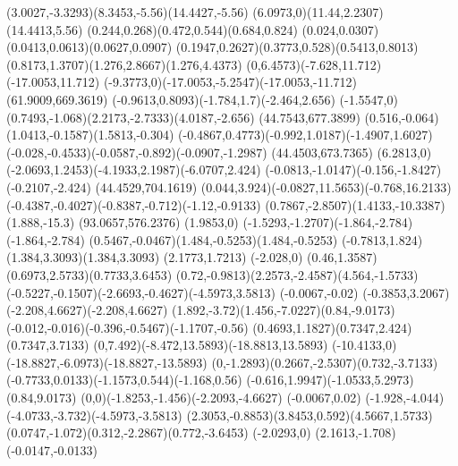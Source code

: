 {    \rcurveto(3.0027,-3.3293)(8.3453,-5.56)(14.4427,-5.56)
    \rcurveto(6.0973,0)(11.44,2.2307)(14.4413,5.56)
    \rcurveto(0.244,0.268)(0.472,0.544)(0.684,0.824)
    \rcurveto(0.024,0.0307)(0.0413,0.0613)(0.0627,0.0907)
    \rcurveto(0.1947,0.2627)(0.3773,0.528)(0.5413,0.8013)
    \rcurveto(0.8173,1.3707)(1.276,2.8667)(1.276,4.4373)
    \rcurveto(0,6.4573)(-7.628,11.712)(-17.0053,11.712)
    \rcurveto(-9.3773,0)(-17.0053,-5.2547)(-17.0053,-11.712)
    \moveto(61.9009,669.3619)
    \rcurveto(-0.9613,0.8093)(-1.784,1.7)(-2.464,2.656)
    \rlineto(-1.5547,0)
    \rcurveto(0.7493,-1.068)(2.2173,-2.7333)(4.0187,-2.656)
    \moveto(44.7543,677.3899)
    \rcurveto(0.516,-0.064)(1.0413,-0.1587)(1.5813,-0.304)
    \rcurveto(-0.4867,0.4773)(-0.992,1.0187)(-1.4907,1.6027)
    \rcurveto(-0.028,-0.4533)(-0.0587,-0.892)(-0.0907,-1.2987)
    \moveto(44.4503,673.7365)
    \rlineto(6.2813,0)
    \rcurveto(-2.0693,1.2453)(-4.1933,2.1987)(-6.0707,2.424)
    \rcurveto(-0.0813,-1.0147)(-0.156,-1.8427)(-0.2107,-2.424)
    \moveto(44.4529,704.1619)
    \rcurveto(0.044,3.924)(-0.0827,11.5653)(-0.768,16.2133)
    \rcurveto(-0.4387,-0.4027)(-0.8387,-0.712)(-1.12,-0.9133)
    \rcurveto(0.7867,-2.8507)(1.4133,-10.3387)(1.888,-15.3)
    \closepath
    \moveto(93.0657,576.2376)
    \rlineto(1.9853,0)
    \rcurveto(-1.5293,-1.2707)(-1.864,-2.784)(-1.864,-2.784)
    \rcurveto(0.5467,-0.0467)(1.484,-0.5253)(1.484,-0.5253)
    \rcurveto(-0.7813,1.824)(1.384,3.3093)(1.384,3.3093)
    \rlineto(2.1773,1.7213)
    \rlineto(-2.028,0)
    \rcurveto(0.46,1.3587)(0.6973,2.5733)(0.7733,3.6453)
    \rcurveto(0.72,-0.9813)(2.2573,-2.4587)(4.564,-1.5733)
    \rcurveto(-0.5227,-0.1507)(-2.6693,-0.4627)(-4.5973,3.5813)
    \rlineto(-0.0067,-0.02)
    \rcurveto(-0.3853,3.2067)(-2.208,4.6627)(-2.208,4.6627)
    \rcurveto(1.892,-3.72)(1.456,-7.0227)(0.84,-9.0173)
    \rcurveto(-0.012,-0.016)(-0.396,-0.5467)(-1.1707,-0.56)
    \rcurveto(0.4693,1.1827)(0.7347,2.424)(0.7347,3.7133)
    \rcurveto(0,7.492)(-8.472,13.5893)(-18.8813,13.5893)
    \rcurveto(-10.4133,0)(-18.8827,-6.0973)(-18.8827,-13.5893)
    \rcurveto(0,-1.2893)(0.2667,-2.5307)(0.732,-3.7133)
    \rcurveto(-0.7733,0.0133)(-1.1573,0.544)(-1.168,0.56)
    \rcurveto(-0.616,1.9947)(-1.0533,5.2973)(0.84,9.0173)
    \rcurveto(0,0)(-1.8253,-1.456)(-2.2093,-4.6627)
    \rlineto(-0.0067,0.02)
    \rcurveto(-1.928,-4.044)(-4.0733,-3.732)(-4.5973,-3.5813)
    \rcurveto(2.3053,-0.8853)(3.8453,0.592)(4.5667,1.5733)
    \rcurveto(0.0747,-1.072)(0.312,-2.2867)(0.772,-3.6453)
    \rlineto(-2.0293,0)
    \rlineto(2.1613,-1.708)
    \rlineto(-0.0147,-0.0133)
}
